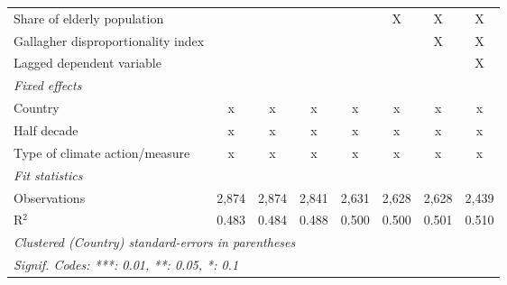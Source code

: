 \begin{tabular}{lccccccc}
   Share of elderly population                                       &               &               &               &               & X             & X             & X\\  
   Gallagher disproportionality index                                &               &               &               &               &               & X             & X\\  
   Lagged dependent variable                                         &               &               &               &               &               &               & X\\  
   \emph{Fixed effects}\\
   Country                                                           & x             & x             & x             & x             & x             & x             & x\\  
   Half decade                                                       & x             & x             & x             & x             & x             & x             & x\\  
   Type of climate action/measure                                    & x             & x             & x             & x             & x             & x             & x\\  
   \midrule \emph{Fit statistics}\\
   Observations                                                      & 2,874         & 2,874         & 2,841         & 2,631         & 2,628         & 2,628         & 2,439\\  
   R$^2$                                                             & 0.483         & 0.484         & 0.488         & 0.500         & 0.500         & 0.501         & 0.510\\  
   \midrule
   \multicolumn{8}{l}{\emph{Clustered (Country) standard-errors in parentheses}}\\
   \multicolumn{8}{l}{\emph{Signif. Codes: ***: 0.01, **: 0.05, *: 0.1}}\\
\end{tabular}
\par\endgroup


